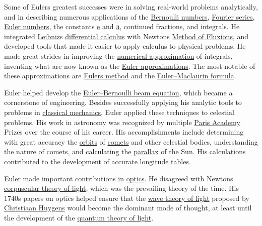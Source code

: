 Some of Euler\textquotesingle s greatest successes were in solving real-world problems analytically, and in describing numerous applications of the \href{https://en.wikipedia.org/wiki/Bernoulli_numbers}{Bernoulli numbers}, \href{https://en.wikipedia.org/wiki/Fourier_series}{Fourier series}, \href{https://en.wikipedia.org/wiki/Euler_number}{Euler numbers}, the constants {\href{https://en.wikipedia.org/wiki/E_(mathematical_constant)}{e}} and \href{https://en.wikipedia.org/wiki/Pi}{{π}}, continued fractions, and integrals. He integrated \href{https://en.wikipedia.org/wiki/Gottfried_Leibniz}{Leibniz}\textquotesingle s \href{https://en.wikipedia.org/wiki/Differential_calculus}{differential calculus} with Newton\textquotesingle s \href{https://en.wikipedia.org/wiki/Method_of_Fluxions}{Method of Fluxions}, and developed tools that made it easier to apply calculus to physical problems. He made great strides in improving the \href{https://en.wikipedia.org/wiki/Numerical_approximation}{numerical approximation} of integrals, inventing what are now known as the \href{https://en.wikipedia.org/wiki/Euler_approximations}{Euler approximations}. The most notable of these approximations are \href{https://en.wikipedia.org/wiki/Euler's_method}{Euler\textquotesingle s method} and the \href{https://en.wikipedia.org/wiki/Euler–Maclaurin_formula}{Euler--Maclaurin formula}.

Euler helped develop the \href{https://en.wikipedia.org/wiki/Euler–Bernoulli_beam_equation}{Euler--Bernoulli beam equation}, which became a cornerstone of engineering. Besides successfully applying his analytic tools to problems in \href{https://en.wikipedia.org/wiki/Classical_mechanics}{classical mechanics}, Euler applied these techniques to celestial problems. His work in astronomy was recognized by multiple \href{https://en.wikipedia.org/wiki/French_Academy_of_Sciences}{Paris Academy} Prizes over the course of his career. His accomplishments include determining with great accuracy the \href{https://en.wikipedia.org/wiki/Orbit}{orbits} of \href{https://en.wikipedia.org/wiki/Comet}{comets} and other celestial bodies, understanding the nature of comets, and calculating the \href{https://en.wikipedia.org/wiki/Solar_parallax}{parallax} of the Sun. His calculations contributed to the development of accurate \href{https://en.wikipedia.org/wiki/History_of_longitude}{longitude tables}.

Euler made important contributions in \href{https://en.wikipedia.org/wiki/Optics}{optics}. He disagreed with Newton\textquotesingle s \href{https://en.wikipedia.org/wiki/Corpuscular_theory_of_light}{corpuscular theory of light}, which was the prevailing theory of the time. His 1740s papers on optics helped ensure that the \href{https://en.wikipedia.org/wiki/Wave_theory_of_light}{wave theory of light} proposed by \href{https://en.wikipedia.org/wiki/Christiaan_Huygens}{Christiaan Huygens} would become the dominant mode of thought, at least until the development of the \href{https://en.wikipedia.org/wiki/Wave-particle_duality}{quantum theory of light}.

